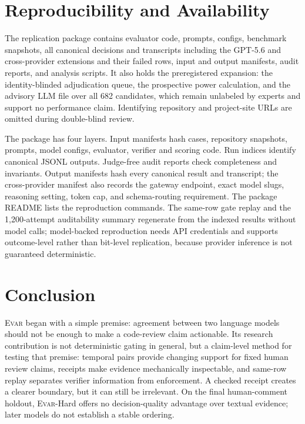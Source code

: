 \documentclass[acmsmall,screen,review,anonymous]{acmart}
\newcommand{\evar}{\textsc{Evar}\xspace}
\begin{document}
\section{Reproducibility and Availability}

The replication package contains evaluator code, prompts, configs, benchmark snapshots, all canonical decisions and transcripts including the GPT-5.6 and cross-provider extensions and their failed rows, input and output manifests, audit reports, and analysis scripts. It also holds the preregistered expansion: the identity-blinded adjudication queue, the prospective power calculation, and the advisory LLM file over all 682 candidates, which remain unlabeled by experts and support no performance claim. Identifying repository and project-site URLs are omitted during double-blind review.

The package has four layers. Input manifests hash cases, repository snapshots, prompts, model configs, evaluator, verifier and scoring code. Run indices identify canonical JSONL outputs. Judge-free audit reports check completeness and invariants. Output manifests hash every canonical result and transcript; the cross-provider manifest also records the gateway endpoint, exact model slugs, reasoning setting, token cap, and schema-routing requirement. The package README lists the reproduction commands. The same-row gate replay and the 1,200-attempt auditability summary regenerate from the indexed results without model calls; model-backed reproduction needs API credentials and supports outcome-level rather than bit-level replication, because provider inference is not guaranteed deterministic.

\section{Conclusion}

\evar began with a simple premise: agreement between two language models should not be enough to make a code-review claim actionable. Its research contribution is not deterministic gating in general, but a claim-level method for testing that premise: temporal pairs provide changing support for fixed human review claims, receipts make evidence mechanically inspectable, and same-row replay separates verifier information from enforcement. A checked receipt creates a clearer boundary, but it can still be irrelevant. On the final human-comment holdout, \evar-Hard offers no decision-quality advantage over textual evidence; later models do not establish a stable ordering.
\end{document}

